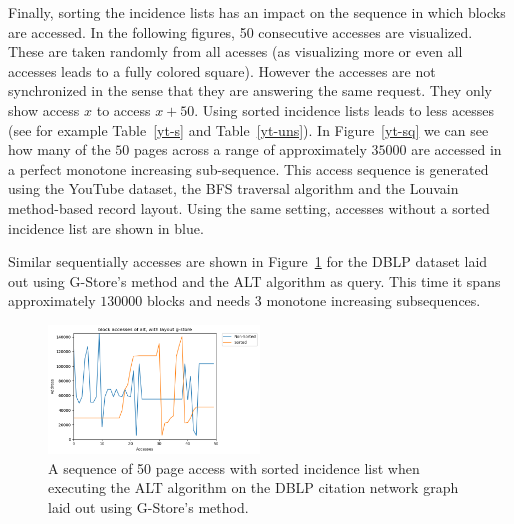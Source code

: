    
    Finally, sorting the incidence lists has an impact on the sequence in which blocks are accessed. 
    In the following figures, 50 consecutive accesses are visualized. These are taken randomly from all acesses (as visualizing more or even all accesses leads to a fully colored square). However the accesses are not synchronized in the sense that they are answering the same request. They only show access $x$ to access $x + 50$. Using sorted incidence lists leads to less acesses (see for example Table~\ref{yt-s} and Table~\ref{yt-uns}).
    In Figure~\ref{yt-sq} we can see how many of the $50$ pages across a range of approximately $35000$ are accessed in a perfect monotone increasing sub-sequence. This access sequence is generated using the YouTube dataset, the BFS traversal algorithm and the Louvain method-based record layout. Using the same setting, accesses without a sorted incidence list are shown in blue.

    Similar sequentially accesses are shown in Figure~\ref{dblp_good} for the DBLP dataset laid out using G-Store's method and the ALT algorithm as query. This time it spans approximately $130000$ blocks and needs 3 monotone increasing subsequences.
    \begin{figure}[htp]
        \begin{center}
            \includegraphics[keepaspectratio,width=0.5\textwidth]{img/07-eval/dblp_g-store_alt_block_sil_access_seq.png}
        \end{center}
        \caption{A sequence of 50 page access with sorted incidence list when executing the ALT algorithm on the DBLP citation network graph laid out using G-Store's method.} 
        \label{dblp_good}
    \end{figure}
    
